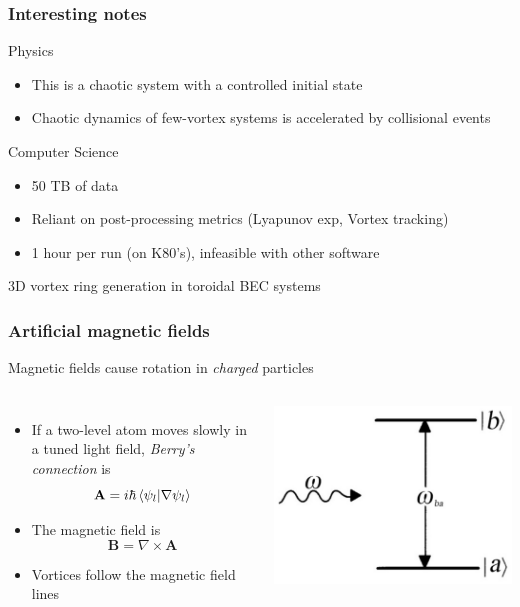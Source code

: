 \documentclass{beamer}
\begin{document}
\begin{frame}
\frametitle{Interesting notes}
Physics
\begin{itemize}
\item This is a chaotic system with a controlled initial state
\item Chaotic dynamics of few-vortex systems is accelerated by collisional events
\end{itemize}
Computer Science
\begin{itemize}
\item 50 TB of data
\item Reliant on post-processing metrics (Lyapunov exp, Vortex tracking)
\item 1 hour per run (on K80's), infeasible with other software
\end{itemize}
\end{frame}

\begin{frame}
\center \huge 3D vortex ring generation in toroidal BEC systems
\end{frame}

\begin{frame}
\frametitle{Artificial magnetic fields}
\begin{center}
Magnetic fields cause rotation in \textit{charged} particles
\end{center}
\begin{columns}
\begin{itemize}
\item If a two-level atom moves slowly in a tuned light field, \textit{Berry's connection} is
$$
\mathbf{A} = i\hbar\braket{\psi_l | \nabla\psi_l}
$$
\item The magnetic field is
$$
\mathbf{B} = \nabla \times \mathbf{A}
$$
\item Vortices follow the magnetic field lines
\end{itemize}
\includegraphics[width=\textwidth]{2level.jpg}
\end{columns}
\end{frame}
\end{document}
